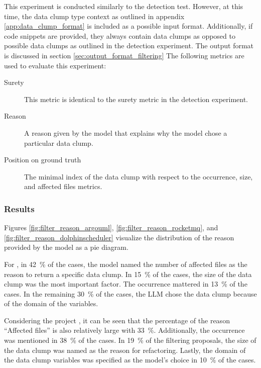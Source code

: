 This experiment is conducted similarly to the detection test. However, at this time, the data clump type context as outlined in appendix \ref{app:data_clump_format} is included as a possible input format. Additionally, if code snippets are provided, they always contain data clumps as opposed to possible data clumps as outlined in the detection experiment. 
The output format is discussed in section \ref{sec:output_format_filtering}
The following metrics are used to evaluate this experiment:
\begin{description}
    

    \item [Surety] This metric is identical to the surety metric in the detection experiment. 
    \item [Reason] A reason given by the model that explains why the model chose a particular data clump. 
    \item [Position on ground truth] The minimal index of the data clump with respect to the occurrence, size, and affected files metrics.
\end{description}


\subsubsection{Results}

Figures \ref{fig:filter_reason_argouml}, \ref{fig:filter_reason_rocketmq}, and \ref{fig:filter_reason_dolphinscheduler} visualize the distribution of the reason provided by the model as a pie diagram.

For \argouml, in 42~\% of the cases, the model named the number of affected files as the reason to return a specific data clump. In 15~\% of the cases, the size of the data clump was the most important factor. The occurrence mattered in 13~\% of the cases. In the remaining 30~\% of the cases, the \ac{LLM} chose the data clump because of the domain of the variables. 

Considering the project \rocketmq, it can be seen that the percentage of the reason \enquote{Affected files} is also relatively large with 33~\%. Additionally, the occurrence was mentioned in 38~\% of the cases. In 19~\% of the filtering proposals, the size of the data clump was named as the reason for refactoring. Lastly, the domain of the data clump variables was specified as the model's choice in 10~\% of the cases.


